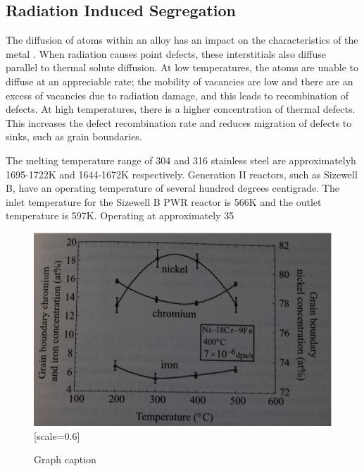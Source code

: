 \subsection{Radiation Induced Segregation}

The diffusion of atoms within an alloy has an impact on the characteristics of the metal \cite{nickeldiffusion}.  When radiation causes point defects, these interstitials also diffuse parallel to thermal solute diffusion.  At low temperatures, the atoms are unable to diffuse at an appreciable rate; the mobility of vacancies are low\cite{gswas} and there are an excess of vacancies due to radiation damage, and this leads to recombination of defects.  At high temperatures, there is a higher concentration of thermal defects\cite{lightwaterallenbusby}.  This increases the defect recombination rate and reduces migration of defects to sinks, such as grain boundaries.

The melting temperature range of 304 and 316 stainless steel are approximatelyh 1695-1722K and 1644-1672K respectively.  Generation II reactors, such as Sizewell B, have an operating temperature of several hundred degrees centigrade.  The inlet temperature for the Sizewell B PWR reactor is 566K\cite{sizewellbtemp} and the outlet temperature is 597K\cite{sizewellbtemp}.  Operating at approximately 35%

\begin{figure}[h]
  \begin{center}
    \includegraphics[scale=0.70]{chapters/background_austenitic_steels_in_nuclear/plots/nicrfeseg.eps}[scale=0.6]
    \caption{Graph caption}
    \label{graph:graph1}
  \end{center}
\end{figure}


